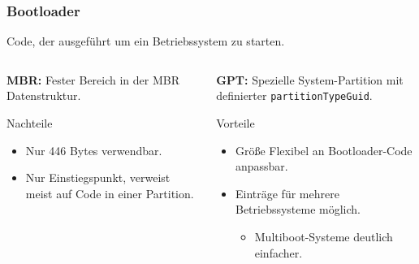 \begin{frame}
    \frametitle{Bootloader}

    Code, der ausgeführt um ein Betriebssystem zu starten.
    
    \vspace{0.5cm}

    \pause

    \begin{columns}[T] 
        \begin{column}{0.4\textwidth}

            \textbf{MBR:} 
            Fester Bereich in der MBR Datenstruktur.

            \vspace{0.5cm}
            \begin{alertblock}{Nachteile}
                \begin{itemize}
                    \item Nur 446 Bytes verwendbar.
                    \item Nur Einstiegspunkt, verweist meist auf Code in einer Partition.
                \end{itemize}
            \end{alertblock}
        \end{column}

        \pause
        \begin{column}{0.45\textwidth}

            \textbf{GPT:} 
            Spezielle System-Partition mit definierter \texttt{partitionTypeGuid}.

            \vspace{0.5cm}
            \begin{exampleblock}{Vorteile}
                \begin{itemize}
                    \item Größe Flexibel an Bootloader-Code anpassbar.
                    \item Einträge für mehrere Betriebssysteme möglich.
                    \begin{itemize}
                        \item Multiboot-Systeme deutlich einfacher.
                    \end{itemize}
                \end{itemize}
            \end{exampleblock}
        \end{column}
    \end{columns}
\end{frame}
